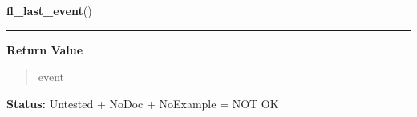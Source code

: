     \vspace{0.5ex}

\hspace{.8\funcindent}\begin{boxedminipage}{\funcwidth}

    \raggedright \textbf{fl\_last\_event}()

    \vspace{-1.5ex}

    \rule{\textwidth}{0.5\fboxrule}
\setlength{\parskip}{2ex}
\setlength{\parskip}{1ex}
      \textbf{Return Value}
    \vspace{-1ex}

      \begin{quote}
      event

      \end{quote}

\textbf{Status:} Untested + NoDoc + NoExample = NOT OK



    \end{boxedminipage}

    \label{xformslib:library:fl_set_event_callback}

    \vspace{0.5ex}

